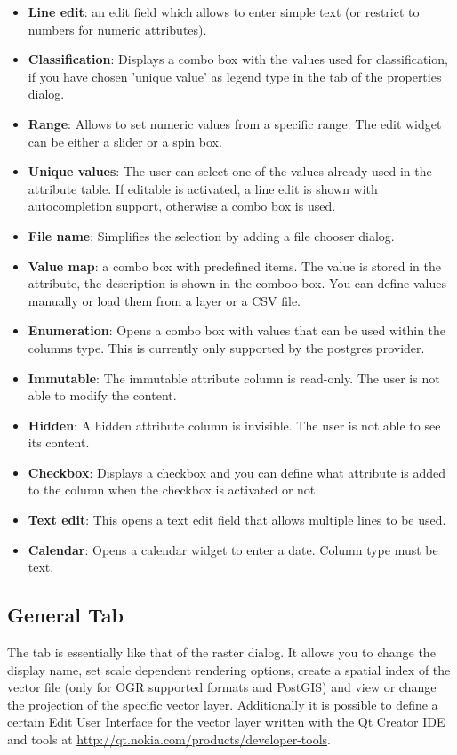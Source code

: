 \begin{itemize}[label=--]
\item \textbf{Line edit}: an edit field which allows to enter simple text (or restrict
to
numbers for numeric attributes).
\item \textbf{Classification}: Displays a combo box with the values used for
classification, if you have chosen 'unique value' as legend type in the
 tab of the properties dialog.
\item \textbf{Range}: Allows to set numeric values from a specific range. The edit
widget can be either a slider or a spin box.
\item \textbf{Unique values}: The user can select one of the values already used in the
attribute table. If editable is activated, a line edit is shown with
autocompletion support, otherwise a combo box is used.
\item \textbf{File name}: Simplifies the selection by adding a file chooser dialog.
\item \textbf{Value map}: a combo box with predefined items. The value is stored in
the attribute, the description is shown in the comboo box. You can define
values manually or load them from a layer or a CSV file.
\item \textbf{Enumeration}: Opens a combo box with values that can be used within the
columns type. This is currently only supported by the postgres provider.
\item \textbf{Immutable}: The immutable attribute column is read-only. The user is not
able to modify the content.
\item \textbf{Hidden}: A hidden attribute column is invisible. The user is not able to 
see its content. 
\item \textbf{Checkbox}: Displays a checkbox and you can define what attribute is added 
to the column when the checkbox is activated or not.
\item \textbf{Text edit}: This opens a text edit field that allows multiple lines to be 
used. 
\item \textbf{Calendar}: Opens a calendar widget to enter a date. Column type must be text.
\end{itemize}

\subsection{General Tab}\label{vectorgeneraltab}

The  tab is essentially like that of the raster dialog. It
allows you to change the display name, set scale dependent rendering options,
create a spatial index of the vector file (only for OGR supported formats and
PostGIS) and view or change the projection of the specific vector layer. 
Additionally it is possible to define a certain Edit User Interface for the 
vector layer written with the Qt Creator IDE and tools at 
\url{http://qt.nokia.com/products/developer-tools}. 

